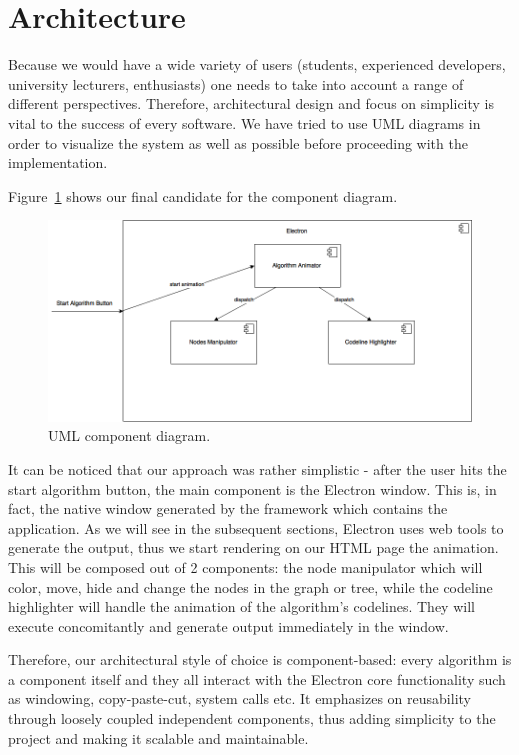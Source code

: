 \documentclass{l4proj}
\begin{document}
\section{Architecture}

Because we would have a wide variety of users (students, experienced developers, university lecturers, enthusiasts) one
needs to take into account a range of different perspectives. Therefore, architectural design and focus on simplicity is vital to the success of every software. We have tried to use UML
diagrams in order to visualize the system as well as possible before proceeding with the implementation.

Figure~\ref{fig:uml-component-diagram} shows our final candidate for the component diagram.

\begin{figure}[!ht]
    \centering
    \includegraphics[scale=0.5]{UML_component_diagram}
    \caption{UML component diagram.}
    \label{fig:uml-component-diagram}
\end{figure}

It can be noticed that our approach was rather simplistic - after the user hits the start algorithm button, the main
component is the Electron window. This is, in fact, the native window generated by the framework which contains the
application. As we will see in the subsequent sections, Electron uses web tools to generate the output, thus we start rendering on
our HTML page the animation. This will be composed out of 2 components: the node manipulator which will color, move,
hide and change the nodes in the graph or tree, while the codeline highlighter will handle the animation of the
algorithm's codelines. They will execute concomitantly and generate output immediately in the window.

Therefore, our architectural style of choice is component-based: every algorithm is a component itself and they all
interact with the Electron core functionality such as windowing, copy-paste-cut, system calls etc. It emphasizes on
reusability through loosely coupled independent components, thus adding simplicity to the project and making it
scalable and maintainable.
\end{document}
